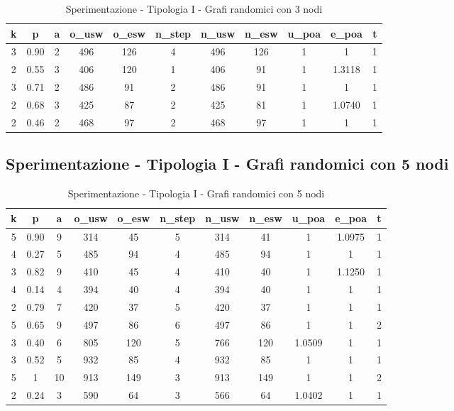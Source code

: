 \begin{table}[H]
\scalebox{0.9} {
\begin{tabular}{|c|c|c|c|c|c|c|c|c|c|c|}
\hline
\textbf{k} & \textbf{p} & \textbf{a} & \textbf{o\_usw} & \textbf{o\_esw} & \textbf{n\_step} & \textbf{n\_usw} & \textbf{n\_esw} & \textbf{u\_poa} & \textbf{e\_poa} & \textbf{t} \\ \hline
3 & 0.90 & 2 & 496 & 126 & 4 & 496 & 126 & 1 & 1 & 1 \\ \hline
2 & 0.55 & 3 & 406 & 120 & 1 & 406 & 91 & 1 & 1.3118 & 1 \\ \hline
3 & 0.71 & 2 & 486 & 91 & 2 & 486 & 91 & 1 & 1 & 1 \\ \hline
2 & 0.68 & 3 & 425 & 87 & 2 & 425 & 81 & 1 & 1.0740 & 1 \\ \hline
2 & 0.46 & 2 & 468 & 97 & 2 & 468 & 97 & 1 & 1 & 1 \\ \hline
\end{tabular}
}
\caption{Sperimentazione - Tipologia I - Grafi randomici con 3 nodi}
\label{tab:sperimentazione-tipo1-3nodi}
\end{table}


\subsection{Sperimentazione - Tipologia I - Grafi randomici con 5 nodi}

\begin{table}[H]
\scalebox{0.9} {
\begin{tabular}{|c|c|c|c|c|c|c|c|c|c|c|}
\hline
\textbf{k} & \textbf{p} & \textbf{a} & \textbf{o\_usw} & \textbf{o\_esw} & \textbf{n\_step} & \textbf{n\_usw} & \textbf{n\_esw} & \textbf{u\_poa} & \textbf{e\_poa} & \textbf{t} \\ \hline
5 & 0.90 & 9 & 314 & 45 & 5 & 314 & 41 & 1 & 1.0975 & 1 \\ \hline
4 & 0.27 & 5 & 485 & 94 & 4 & 485 & 94 & 1 & 1 & 1 \\ \hline
3 & 0.82 & 9 & 410 & 45 & 4 & 410 & 40 & 1 & 1.1250 & 1 \\ \hline
4 & 0.14 & 4 & 394 & 40 & 4 & 394 & 40 & 1 & 1 & 1 \\ \hline
2 & 0.79 & 7 & 420 & 37 & 5 & 420 & 37 & 1 & 1 & 1 \\ \hline
5 & 0.65 & 9 & 497 & 86 & 6 & 497 & 86 & 1 & 1 & 2 \\ \hline
3 & 0.40 & 6 & 805 & 120 & 5 & 766 & 120 & 1.0509 & 1 & 1 \\ \hline
3 & 0.52 & 5 & 932 & 85 & 4 & 932 & 85 & 1 & 1 & 1 \\ \hline
5 & 1 & 10 & 913 & 149 & 3 & 913 & 149 & 1 & 1 & 2 \\ \hline
2 & 0.24 & 3 & 590 & 64 & 3 & 566 & 64 & 1.0402 & 1 & 1 \\ \hline
\end{tabular}
}
\caption{Sperimentazione - Tipologia I - Grafi randomici con 5 nodi}
\label{tab:sperimentazione-tipo1-5nodi}
\end{table}


